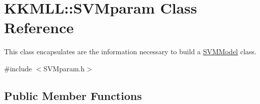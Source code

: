 \hypertarget{class_k_k_m_l_l_1_1_s_v_mparam}{}\section{K\+K\+M\+LL\+:\+:S\+V\+Mparam Class Reference}
\label{class_k_k_m_l_l_1_1_s_v_mparam}


This class encapsulates are the information necessary to build a \hyperlink{class_k_k_m_l_l_1_1_s_v_m_model}{S\+V\+M\+Model} class.  




{\ttfamily \#include $<$S\+V\+Mparam.\+h$>$}

\subsection*{Public Member Functions}
